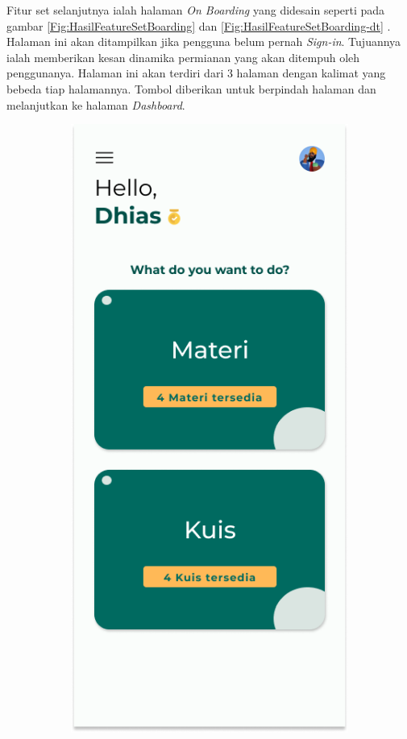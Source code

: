 Fitur set selanjutnya ialah halaman \textit{On Boarding} yang didesain seperti pada gambar \ref*{Fig:HasilFeatureSetBoarding} dan \ref*{Fig:HasilFeatureSetBoarding-dt} . 
Halaman ini akan ditampilkan jika pengguna belum pernah \textit{Sign-in}. 
Tujuannya ialah memberikan kesan dinamika permianan yang akan ditempuh oleh penggunanya.
Halaman ini akan terdiri dari 3 halaman dengan kalimat yang bebeda tiap halamannya.
Tombol diberikan untuk berpindah halaman dan melanjutkan ke halaman \textit{Dashboard}.
\begin{figure}[H]
	\centering
	\begin{subfigure}[b]{0.23\textwidth}
		\centering
	  \includegraphics[width=\linewidth]{contents/chapter-3/images/HF-Main.png}

\end{subfigure}
\end{figure}
